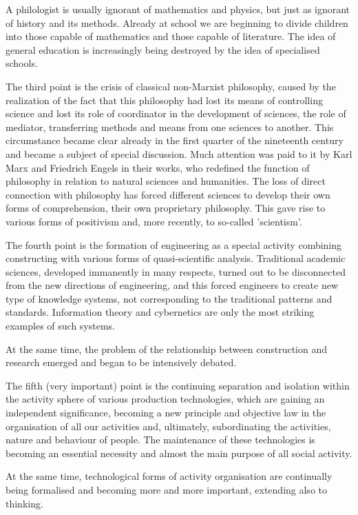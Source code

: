 \documentclass[11pt,a4paper]{article}
\begin{document}
A philologist is usually ignorant of mathematics and physics, but just as
ignorant of history and its methods. Already at school we are beginning to
divide children into those capable of mathematics and those capable of
literature. The idea of general education is increasingly being destroyed by
the idea of specialised schools.

The third point is the crisis of classical non-Marxist philosophy, caused by
the realization of the fact that this philosophy had lost its means of
controlling science and lost its role of coordinator in the development of
sciences, the role of mediator, transferring methods and means from one
sciences to another. This circumstance became clear already in the first
quarter of the nineteenth century and became a subject of special discussion.
Much attention was paid to it by Karl Marx and Friedrich Engels in their
works, who redefined the function of philosophy in relation to natural
sciences and humanities. The loss of direct connection with philosophy has
forced different sciences to develop their own forms of comprehension, their
own proprietary philosophy. This gave rise to various forms of positivism and,
more recently, to so-called 'scientism'.

The fourth point is the formation of engineering as a special activity
combining constructing with various forms of quasi-scientific analysis.
Traditional academic sciences, developed immanently in many respects, turned
out to be disconnected from the new directions of engineering, and this forced
engineers to create new type of knowledge systems, not corresponding to the
traditional patterns and standards. Information theory and cybernetics are
only the most striking examples of such systems.

At the same time, the problem of the relationship between construction and
research emerged and began to be intensively debated.

The fifth (very important) point is the continuing separation and isolation
within the activity sphere of various production technologies, which are
gaining an independent significance, becoming a new principle and objective
law in the organisation of all our activities and, ultimately, subordinating
the activities, nature and behaviour of people. The maintenance of these
technologies is becoming an essential necessity and almost the main purpose of
all social activity.

At the same time, technological forms of activity organisation are continually
being formalised and becoming more and more important, extending also to
thinking.
\end{document}
